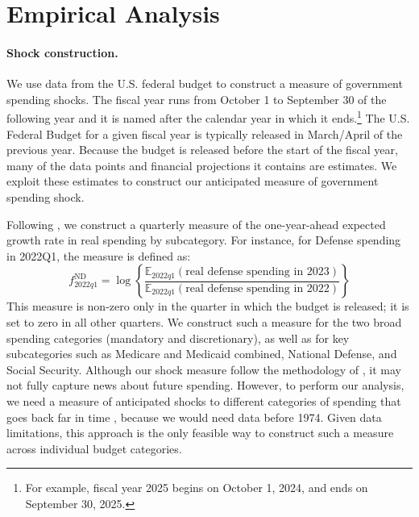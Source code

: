 \documentclass[12pt]{article}%
\theoremstyle{remark}
\begin{document}

\section{Empirical Analysis\label{sec: method}} 
\paragraph{Shock construction.} We use data from the U.S. federal budget to construct a measure of government spending shocks. The fiscal year runs from October 1 to September 30 of the following year and it is named after the calendar year in which it ends.\footnote{For example, fiscal year 2025 begins on October 1, 2024, and ends on September 30, 2025.} The U.S. Federal Budget for a given fiscal year is typically released in March/April of the previous year. Because the budget is released before the start of the fiscal year, many of the data points and financial projections it contains are estimates. We exploit these estimates to construct our anticipated measure of government spending shock. 

Following \cite{ForniGambetti2016}, we construct a quarterly measure of the one-year-ahead expected growth rate in real spending by subcategory. For instance, for Defense spending in 2022Q1, the measure is defined as:
     $$f^\text{ND}_{2022q1} = \log\left\{\frac{\mathbb{E}_{2022q1}(\text{real defense spending in 2023})}{\mathbb{E}_{2022q1}(\text{real defense spending in 2022})}\right\}$$
This measure is non-zero only in the quarter in which the budget is released; it is set to zero in all other quarters. We construct such a measure for the two broad spending categories (mandatory and discretionary), as well as for key subcategories such as Medicare and Medicaid combined, National Defense, and Social Security. Although our shock measure follow the methodology of \cite{ForniGambetti2016}, it may not fully capture news about future spending. However, to perform our analysis, we need a measure of anticipated shocks to different categories of spending that goes back far in time , because we would need data before 1974. Given data limitations, this approach is the only feasible way to construct such a measure across individual budget categories.
\end{document}
